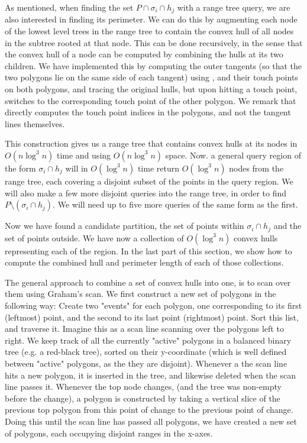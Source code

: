 \documentclass{article}
\begin{document}
As mentioned, when finding the set $P \cap \sigma_i \cap h_j$ with a range tree query, we are also interested in finding its perimeter. We can do this by augmenting each node of the lowest level trees in the range tree to contain the convex hull of all nodes in the subtree rooted at that node. This can be done recursively, in the sense that the convex hull of a node can be computed by combining the hulls at its two children. We have implemented this by computing the outer tangents (so that the two polygons lie on the same side of each tangent) using \cite{ks95}, and their touch points on both polygons, and tracing the original hulls, but upon hitting a touch point, switches to the corresponding touch point of the other polygon. We remark that \cite{ks95} directly computes the touch point indices in the polygons, and not the tangent lines themselves.

This construction gives us a range tree that contains convex hulls at its nodes in $O(n \log^3 n)$ time and using $O(n \log^3 n)$ space. Now. a general query region of the form $\sigma_i \cap h_j$ will in $O(\log^3n)$ time return $O(\log^3 n)$ nodes from the range tree, each covering a disjoint subset of the points in the query region. We will also make a few more disjoint queries into the range tree, in order to find $P \setminus (\sigma_i \cap h_j)$. We will need up to five more queries of the same form as the first. 

Now we have found a candidate partition, the set of points within $\sigma_i \cap h_j$ and the set of points outside. We have now a collection of $O(\log^3 n)$ convex hulls representing each of the region. In the last part of this section, we show how to compute the combined hull and perimeter length of each of those collections. 

The general approach to combine a set of convex hulls into one, is to scan over them using Graham's scan. We first construct a new set of polygons in the following way: Create two "events" for each polygon, one corresponding to its first (leftmost) point, and the second to its last point (rightmost) point. Sort this list, and traverse it. Imagine this as a scan line scanning over the polygons left to right. We keep track of all the currently "active" polygons in a balanced binary tree (e.g. a red-black tree), sorted on their y-coordinate (which is well defined between "active" polygons, as the they are disjoint). Whenever a the scan line hits a new polygon, it is inserted in the tree, and likewise deleted when the scan line passes it. Whenever the top node changes, (and the tree was non-empty before the change), a polygon is constructed by taking a vertical slice of the previous top polygon from this point of change to the previous point of change. Doing this until the scan line has passed all polygons, we have created a new set of polygons, each occupying disjoint ranges in the x-axes. 
\end{document}
